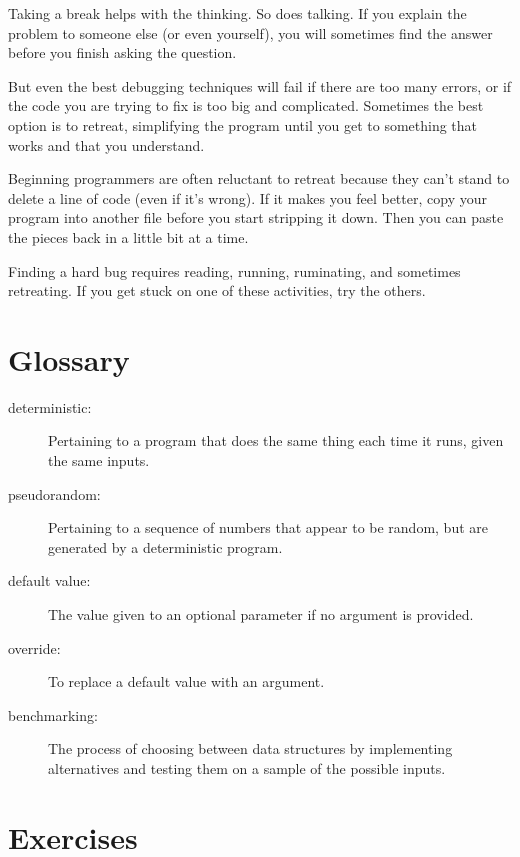\documentclass[10pt]{book}
\begin{document}
Taking a break helps with the thinking.  So does talking.
If you explain the problem to someone else (or even yourself), you
will sometimes find the answer before you finish asking the question.

But even the best debugging techniques will fail if there are too many
errors, or if the code you are trying to fix is too big and
complicated.  Sometimes the best option is to retreat, simplifying the
program until you get to something that works and that you
understand.

Beginning programmers are often reluctant to retreat because
they can't stand to delete a line of code (even if it's wrong).
If it makes you feel better, copy your program into another file
before you start stripping it down.  Then you can paste the pieces
back in a little bit at a time.

Finding a hard bug requires reading, running, ruminating, and
sometimes retreating.  If you get stuck on one of these activities,
try the others.


\section{Glossary}

\begin{description}

\item[deterministic:] Pertaining to a program that does the same
thing each time it runs, given the same inputs.

\item[pseudorandom:] Pertaining to a sequence of numbers that appear
to be random, but are generated by a deterministic program.

\item[default value:] The value given to an optional parameter if no
argument is provided.

\item[override:] To replace a default value with an argument.

\item[benchmarking:] The process of choosing between data structures
by implementing alternatives and testing them on a sample of the
possible inputs.

\end{description}


\section{Exercises}
\end{document}
